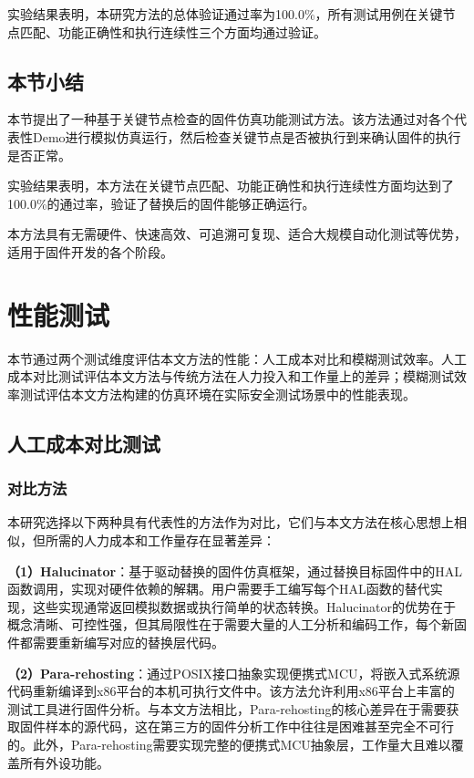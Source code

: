 实验结果表明，本研究方法的总体验证通过率为100.0\%，所有测试用例在关键节点匹配、功能正确性和执行连续性三个方面均通过验证。

\subsection{本节小结}

本节提出了一种基于关键节点检查的固件仿真功能测试方法。该方法通过对各个代表性Demo进行模拟仿真运行，然后检查关键节点是否被执行到来确认固件的执行是否正常。

实验结果表明，本方法在关键节点匹配、功能正确性和执行连续性方面均达到了100.0\%的通过率，验证了替换后的固件能够正确运行。

本方法具有无需硬件、快速高效、可追溯可复现、适合大规模自动化测试等优势，适用于固件开发的各个阶段。

\section{性能测试}
\label{sec:performance_test}

本节通过两个测试维度评估本文方法的性能：人工成本对比和模糊测试效率。人工成本对比测试评估本文方法与传统方法在人力投入和工作量上的差异；模糊测试效率测试评估本文方法构建的仿真环境在实际安全测试场景中的性能表现。

\subsection{人工成本对比测试}

\subsubsection{对比方法}
  
本研究选择以下两种具有代表性的方法作为对比，它们与本文方法在核心思想上相似，但所需的人力成本和工作量存在显著差异：

\textbf{（1）Halucinator}：基于驱动替换的固件仿真框架，通过替换目标固件中的HAL函数调用，实现对硬件依赖的解耦。用户需要手工编写每个HAL函数的替代实现，这些实现通常返回模拟数据或执行简单的状态转换。Halucinator的优势在于概念清晰、可控性强，但其局限性在于需要大量的人工分析和编码工作，每个新固件都需要重新编写对应的替换层代码。

\textbf{（2）Para-rehosting}：通过POSIX接口抽象实现便携式MCU，将嵌入式系统源代码重新编译到x86平台的本机可执行文件中。该方法允许利用x86平台上丰富的测试工具进行固件分析。与本文方法相比，Para-rehosting的核心差异在于需要获取固件样本的源代码，这在第三方的固件分析工作中往往是困难甚至完全不可行的。此外，Para-rehosting需要实现完整的便携式MCU抽象层，工作量大且难以覆盖所有外设功能。

